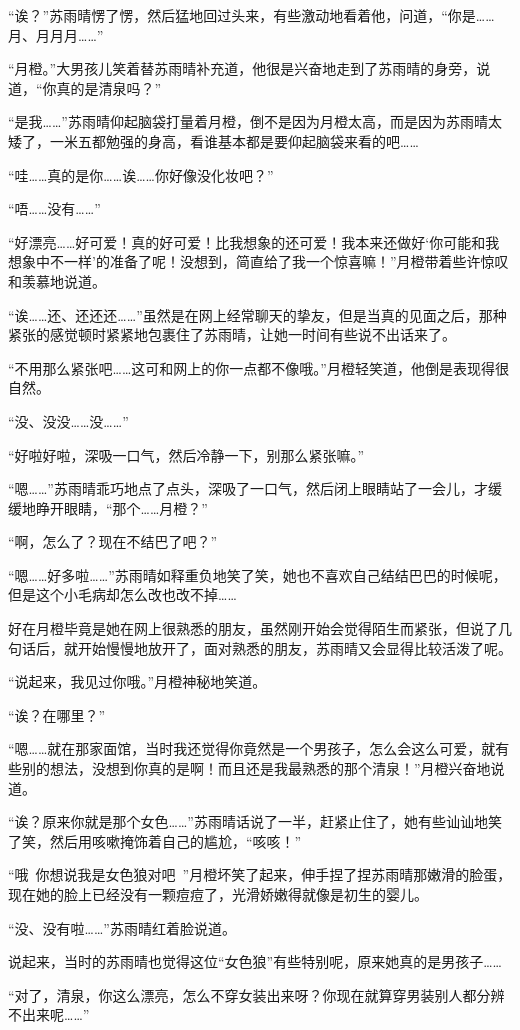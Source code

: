 “诶？”苏雨晴愣了愣，然后猛地回过头来，有些激动地看着他，问道，“你是……月、月月月……”

“月橙。”大男孩儿笑着替苏雨晴补充道，他很是兴奋地走到了苏雨晴的身旁，说道，“你真的是清泉吗？”

“是我……”苏雨晴仰起脑袋打量着月橙，倒不是因为月橙太高，而是因为苏雨晴太矮了，一米五都勉强的身高，看谁基本都是要仰起脑袋来看的吧……

“哇……真的是你……诶……你好像没化妆吧？”

“唔……没有……”

“好漂亮……好可爱！真的好可爱！比我想象的还可爱！我本来还做好‘你可能和我想象中不一样’的准备了呢！没想到，简直给了我一个惊喜嘛！”月橙带着些许惊叹和羡慕地说道。

“诶……还、还还还……”虽然是在网上经常聊天的挚友，但是当真的见面之后，那种紧张的感觉顿时紧紧地包裹住了苏雨晴，让她一时间有些说不出话来了。

“不用那么紧张吧……这可和网上的你一点都不像哦。”月橙轻笑道，他倒是表现得很自然。

“没、没没……没……”

“好啦好啦，深吸一口气，然后冷静一下，别那么紧张嘛。”

“嗯……”苏雨晴乖巧地点了点头，深吸了一口气，然后闭上眼睛站了一会儿，才缓缓地睁开眼睛，“那个……月橙？”

“啊，怎么了？现在不结巴了吧？”

“嗯……好多啦……”苏雨晴如释重负地笑了笑，她也不喜欢自己结结巴巴的时候呢，但是这个小毛病却怎么改也改不掉……

好在月橙毕竟是她在网上很熟悉的朋友，虽然刚开始会觉得陌生而紧张，但说了几句话后，就开始慢慢地放开了，面对熟悉的朋友，苏雨晴又会显得比较活泼了呢。

“说起来，我见过你哦。”月橙神秘地笑道。

“诶？在哪里？”

“嗯……就在那家面馆，当时我还觉得你竟然是一个男孩子，怎么会这么可爱，就有些别的想法，没想到你真的是啊！而且还是我最熟悉的那个清泉！”月橙兴奋地说道。

“诶？原来你就是那个女色……”苏雨晴话说了一半，赶紧止住了，她有些讪讪地笑了笑，然后用咳嗽掩饰着自己的尴尬，“咳咳！”

“哦~你想说我是女色狼对吧~”月橙坏笑了起来，伸手捏了捏苏雨晴那嫩滑的脸蛋，现在她的脸上已经没有一颗痘痘了，光滑娇嫩得就像是初生的婴儿。

“没、没有啦……”苏雨晴红着脸说道。

说起来，当时的苏雨晴也觉得这位“女色狼”有些特别呢，原来她真的是男孩子……

“对了，清泉，你这么漂亮，怎么不穿女装出来呀？你现在就算穿男装别人都分辨不出来呢……”

